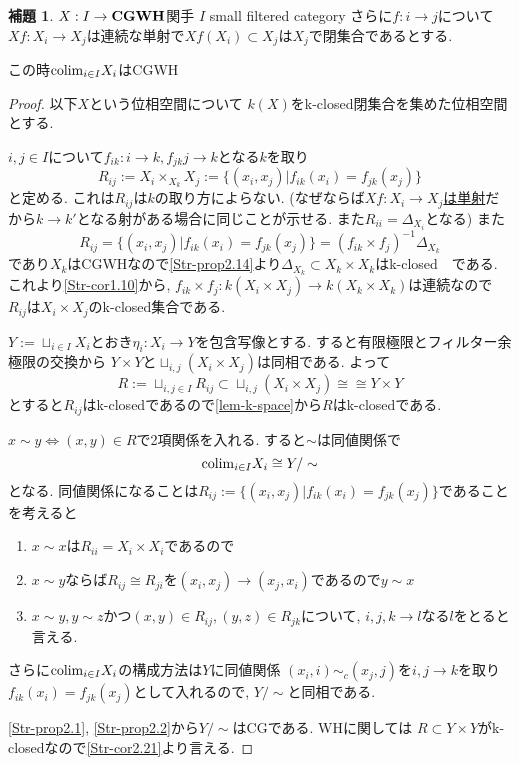 \documentclass[dvipdfmx,a4paper,11pt]{article}
\newcommand{\colim}{{\rm colim}}
\theoremstyle{definition}
\newtheorem{lem}[thm]{補題}
\newcommand{\xr}[1]{\textcolor{red}{#1}}
\begin{document}
\begin{tcolorbox}
 [colback = white, colframe = green!35!black, fonttitle = \bfseries,breakable = true]

\begin{lem}\cite[Lemma 3.3]{Str}
\label{lem-weakhaus-2}
$X : I \to {\bf CGWH}$関手
$I$ small filtered category
さらに$f: i \to j$について$Xf : X_i \to X_j$は連続な単射で$Xf(X_i) \subset X_j$は$X_j$で閉集合であるとする. 

この時$\colim_{i \in I}X_i$はCGWH
\end{lem}
\end{tcolorbox}

\begin{proof}
以下$X$という位相空間について
$k(X)$をk-closed閉集合を集めた位相空間とする. 


$i,j \in I$について$f_{ik}:i \to k, f_{jk}j \to k$となる$k$を取り
$$
R_{ij}:= X_{i} \times_{X_{k}} X_{j} := \{ (x_i, x_j) | f_{ik}(x_i) = f_{jk}(x_j)\}
$$
と定める. 
これは$R_{ij}$は$k$の取り方によらない. 
(なぜならば\underline{$Xf : X_i \to X_j$は単射}だから$k \to k'$となる射がある場合に同じことが示せる. また$R_{ii}= \Delta_{X_i}$となる)
また
$$
R_{ij}=\{ (x_i, x_j) | f_{ik}(x_i) = f_{jk}(x_j)\} = (f_{ik} \times f_{j})^{-1}\Delta_{X_k}
$$
であり$X_k$はCGWHなので\ref{Str-prop2.14}より$\Delta_{X_{k}} \subset X_k \times X_k$はk-closed　である.
これより\ref{Str-cor1.10}から, $f_{ik} \times f_{j} : k(X_i \times X_j) \to k(X_k \times X_k)$は連続なので
$R_{ij}$は$X_i \times X_j$のk-closed集合である. 

$Y :=\sqcup_{i \in I}X_{i}$とおき$\eta_i : X_i \to Y$を包含写像とする. 
すると有限極限とフィルター余極限の交換から
$Y \times Y $と$ \sqcup_{i,j} (X_i \times X_j) $は同相である. 
よって
$$
R := \sqcup_{i,j \in I}R_{ij} \subset \sqcup_{i,j} (X_i \times X_j) \cong \cong Y \times Y
$$
とすると$R_{ij}$はk-closedであるので\ref{lem-k-space}から$R$はk-closedである. 

$x \sim y \Leftrightarrow (x,y) \in R$で2項関係を入れる.
すると$\sim$は同値関係で
$$
\colim_{i \in I}X_i  \cong Y/\sim
$$ 
となる.
同値関係になることは$R_{ij}:= \{ (x_i, x_j) | f_{ik}(x_i) = f_{jk}(x_j)\}$であることを考えると
\begin{enumerate}
\item  $x \sim x$は$R_{ii}=X_{i} \times X_{i}$であるので
\item $x \sim y$ならば$R_{ij} \cong R_{ji}$を$(x_i, x_j) \to (x_j, x_i)$であるので$y \sim x$
\item $x \sim y, y \sim z$かつ$(x,y) \in R_{ij}, (y,z) \in R_{jk}$について, $i,j,k \to l$なる$l$をとると言える. 
\end{enumerate}
さらに$\colim_{i \in I}X_i  $の構成方法は$Y$に同値関係
$(x_i, i)\sim_{c} (x_j, j)$を$i,j \to k$を取り$f_{ik}(x_i) = f_{jk}(x_j)$として入れるので, $Y/\sim$と同相である.

\ref{Str-prop2.1}, \ref{Str-prop2.2}から$Y/\sim$はCGである.
WHに関しては
$R \subset Y \times Y$がk-closedなので\ref{Str-cor2.21}より言える.

\end{proof}
\end{document}
